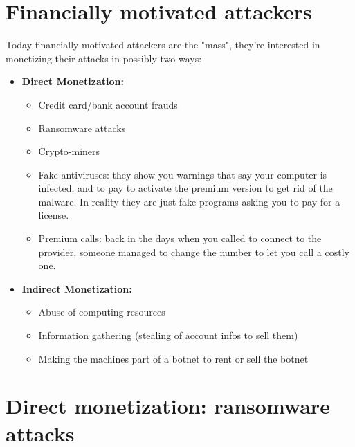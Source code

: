     \section{Financially motivated attackers}
        Today financially motivated attackers are the "mass", they're interested in monetizing their attacks in possibly two ways:
        \begin{itemize}
            \item \textbf{Direct Monetization:}
                \begin{itemize}
                    \item Credit card/bank account frauds
                    \item Ransomware attacks 
                    \item Crypto-miners
                    \item Fake antiviruses: they show you warnings that say your computer is infected, and to pay to activate the premium version to get rid of the malware. In reality they are just fake programs asking you to pay for a license.
                    \item Premium calls: back in the days when you called to connect to the provider, someone managed to change the number to let you call a costly one.
                \end{itemize} 
            \item \textbf{Indirect Monetization:}
                \begin{itemize}
                    \item Abuse of computing resources
                    \item Information gathering (stealing of account infos to sell them)
                    \item Making the machines part of a botnet to rent or sell the botnet
                \end{itemize}
        \end{itemize}
\newpage
    \section{Direct monetization: ransomware attacks}
